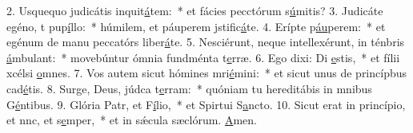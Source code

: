 2. Usquequo judicátis inquit\uline{á}tem:~* et fácies pecctórum s\uline{ú}mitis?
3. Judicáte egéno, t pup\uline{í}llo:~* húmilem, et páuperem jstific\uline{á}te.
4. Erípte p\uline{áu}perem:~* et egénum de manu peccatórs liber\uline{á}te.
5. Nesciérunt, neque intellexérunt, in ténbris \uline{á}mbulant:~* movebúntur ómnia fundménta t\uline{e}rræ.
6. Ego dixi: Di \uline{e}stis,~* et fílii xcélsi \uline{o}mnes.
7. Vos autem sicut hómines mri\uline{é}mini:~* et sicut unus de princípbus cad\uline{é}tis.
8. Surge, Deus, júdca t\uline{e}rram:~* quóniam tu hereditábis in mnibus G\uline{é}ntibus.
9. Glória Patr, et F\uline{í}lio,~* et Spirtui S\uline{a}ncto.
10. Sicut erat in princípio, et nnc, et s\uline{e}mper,~* et in sǽcula sæclórum. \uline{A}men.
